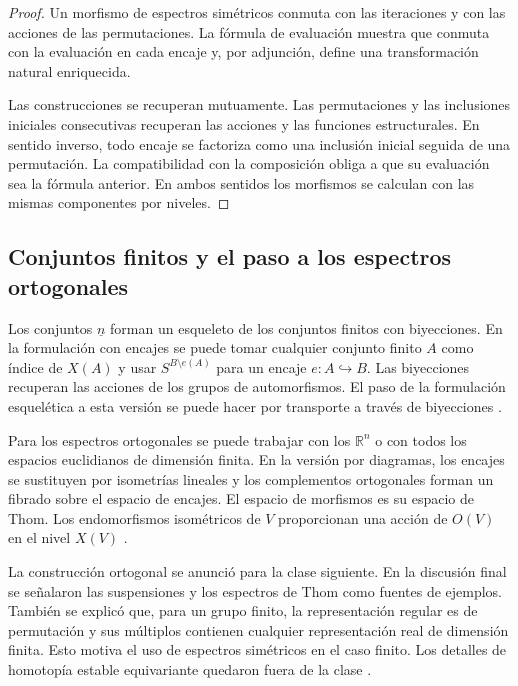 \begin{proof}
Un morfismo de espectros simétricos conmuta con las iteraciones y con las acciones de las permutaciones. La fórmula de evaluación muestra que conmuta con la evaluación en cada encaje y, por adjunción, define una transformación natural enriquecida.

Las construcciones se recuperan mutuamente. Las permutaciones y las inclusiones iniciales consecutivas recuperan las acciones y las funciones estructurales. En sentido inverso, todo encaje se factoriza como una inclusión inicial seguida de una permutación. La compatibilidad con la composición obliga a que su evaluación sea la fórmula anterior. En ambos sentidos los morfismos se calculan con las mismas componentes por niveles.
\end{proof}

\subsection{Conjuntos finitos y el paso a los espectros ortogonales}

Los conjuntos $\underline n$ forman un esqueleto de los conjuntos finitos con biyecciones. En la formulación con encajes se puede tomar cualquier conjunto finito $A$ como índice de $X(A)$ y usar $S^{B\setminus e(A)}$ para un encaje $e\colon A\hookrightarrow B$. Las biyecciones recuperan las acciones de los grupos de automorfismos. El paso de la formulación esquelética a esta versión se puede hacer por transporte a través de biyecciones \cite[§~1.2]{hausmann2019}.

Para los espectros ortogonales se puede trabajar con los $\mathbb R^n$ o con todos los espacios euclidianos de dimensión finita. En la versión por diagramas, los encajes se sustituyen por isometrías lineales y los complementos ortogonales forman un fibrado sobre el espacio de encajes. El espacio de morfismos es su espacio de Thom. Los endomorfismos isométricos de $V$ proporcionan una acción de $O(V)$ en el nivel $X(V)$ \cite[definición~6.1.9]{malkiewich}.

\begin{nota}
La construcción ortogonal se anunció para la clase siguiente. En la discusión final se señalaron las suspensiones y los espectros de Thom como fuentes de ejemplos. También se explicó que, para un grupo finito, la representación regular es de permutación y sus múltiplos contienen cualquier representación real de dimensión finita. Esto motiva el uso de espectros simétricos en el caso finito. Los detalles de homotopía estable equivariante quedaron fuera de la clase \cite[introducción]{hausmann2019}.
\end{nota}
